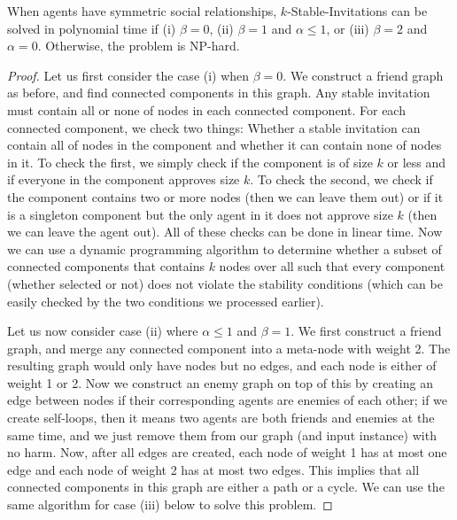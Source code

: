 \begin{theorem} \label{SIP:thm:symmetric_stable_p_npc}
	When agents have symmetric social relationships, 	
	$k$-Stable-Invitations can be solved in polynomial time if (i) $\beta = 0$, (ii) $\beta = 1$ and $\alpha \leq 1$, or (iii) $\beta = 2$ and $\alpha = 0$. Otherwise, the problem is NP-hard. 
\end{theorem}
\begin{proof}
	Let us first consider the case (i) when $\beta = 0$.
	We construct a friend graph as before, and find connected components in this graph. 
	Any stable invitation must contain all or none of nodes in each connected component.
	For each connected component, we check two things: Whether a stable invitation can contain all of nodes in the component and whether it can contain none of nodes in it. 
	To check the first, we simply check if the component is of size $k$ or less and if everyone in the component approves size $k$. 
	To check the second, we check if the component contains two or more nodes (then we can leave them out) or if it is a singleton component but the only agent in it does not approve size $k$ (then we can leave the agent out). All of these checks can be done in linear time.
	Now we can use a dynamic programming algorithm to determine whether a subset of connected components that contains $k$ nodes over all such that every component (whether selected or not) does not violate the stability conditions (which can be easily checked by the two conditions we processed earlier).
	
	Let us now consider case (ii) where $\alpha \leq 1$ and $\beta = 1$.
	We first construct a friend graph, and merge any connected component into a meta-node with weight 2.
	The resulting graph would only have nodes but no edges, and each node is either of weight 1 or 2.
	Now we construct an enemy graph on top of this by creating an edge between nodes if their corresponding agents are enemies of each other; if we create self-loops, then it means two agents are both friends and enemies at the same time, and we just remove them from our graph (and input instance) with no harm.
	Now, after all edges are created, each node of weight 1 has at most one edge and each node of weight 2 has at most two edges. This implies that all connected components in this graph are either a path or a cycle.
	We can use the same algorithm for case (iii) below to solve this problem. 


\end{proof}
